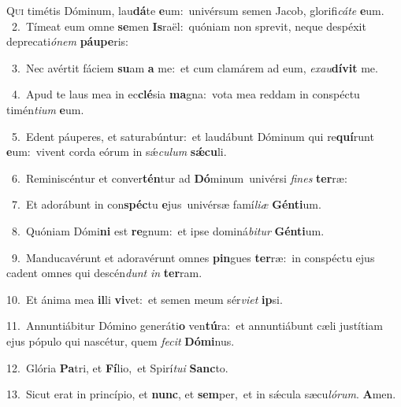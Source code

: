 \lettrine{\initial\textcolor{\initialcolor}{Q}}{ui} timétis Dóminum, lau\-\textbf{dá}\-te \textbf{e}\-um:~\star univérsum semen Jacob, glorifi\-\textit{cá}\-\textit{te} \textbf{e}\-um.\\
{\numbfont\textcolor{\numbcolor}{~2.}}~Tímeat eum omne \textbf{se}\-men \textbf{Is}\-raël:~\star quóniam non sprevit, neque despéxit deprecati\-\textit{ó}\-\textit{nem} \textbf{páu}\-\textbf{pe}ris:\par
{\numbfont\textcolor{\numbcolor}{~3.}}~Nec avértit fáciem \textbf{su}\-am \textbf{a} me:~\star et cum clamárem ad eum, \textit{ex}\-\textit{au}\textbf{dí}\textbf{vit} me.\par
{\numbfont\textcolor{\numbcolor}{~4.}}~Apud te laus mea in ec\-\textbf{clé}\-sia \textbf{ma}\-gna:~\star vota mea reddam in conspéctu timén\-\textit{ti}\-\textit{um} \textbf{e}\-um.\par
{\numbfont\textcolor{\numbcolor}{~5.}}~Edent páuperes, et saturabúntur:~\dagger et laudábunt Dóminum qui re\-\textbf{quí}\-runt \textbf{e}\-um:~\star vivent corda eórum in sǽ\-\textit{cu}\-\textit{lum} \textbf{sǽ}\-\textbf{cu}li.\par
{\numbfont\textcolor{\numbcolor}{~6.}}~Reminiscéntur et conver\-\textbf{tén}\-tur ad \textbf{Dó}\-minum~\star univérsi \textit{fi}\-\textit{nes} \textbf{ter}\-ræ:\par
{\numbfont\textcolor{\numbcolor}{~7.}}~Et adorábunt in con\-\textbf{spéc}\-tu \textbf{e}\-jus~\star univérsæ famí\-\textit{li}\-\textit{æ} \textbf{Gén}\-\textbf{ti}um.\par
{\numbfont\textcolor{\numbcolor}{~8.}}~Quóniam Dómi\textbf{ni} est \textbf{re}\-gnum:~\star et ipse dominá\-\textit{bi}\-\textit{tur} \textbf{Gén}\-\textbf{ti}um.\par
{\numbfont\textcolor{\numbcolor}{~9.}}~Manducavérunt et adoravérunt omnes \textbf{pin}\-gues \textbf{ter}\-ræ:~\star in conspéctu ejus cadent omnes qui descén\textit{dunt} \textit{in} \textbf{ter}\-ram.\par
{\numbfont\textcolor{\numbcolor}{10.}}~Et ánima mea \textbf{il}\-li \textbf{vi}\-vet:~\star et semen meum sér\-\textit{vi}\-\textit{et} \textbf{ip}\-si.\par
{\numbfont\textcolor{\numbcolor}{11.}}~Annuntiábitur Dómino generáti\textbf{o} ven\-\textbf{tú}\-ra:~\star et annuntiábunt cæli justítiam ejus pópulo qui nascétur, quem \textit{fe}\-\textit{cit} \textbf{Dó}\-\textbf{mi}nus.\par
{\numbfont\textcolor{\numbcolor}{12.}}~Glória \textbf{Pa}\-tri, et \textbf{Fí}\-lio,~\star et Spirí\-\textit{tu}\-\textit{i} \textbf{Sanc}\-to.\par
{\numbfont\textcolor{\numbcolor}{13.}}~Sicut erat in princípio, et \textbf{nunc}\-, et \textbf{sem}\-per,~\star et in sǽcula sæcu\-\textit{ló}\-\textit{rum}. \textbf{A}\-men.\par
